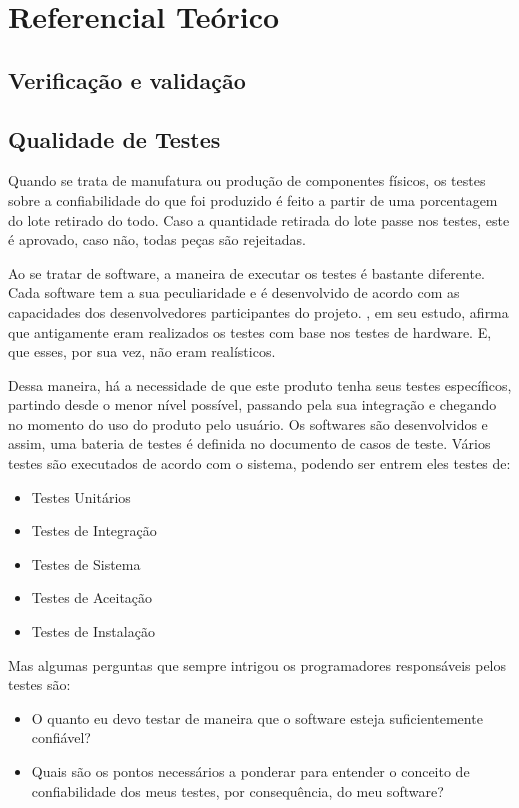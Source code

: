 \chapter[Referencial]{Referencial Teórico}

\section{Verificação e validação}
\section{Qualidade de Testes}
Quando se trata de manufatura ou produção de componentes físicos, os testes
sobre a confiabilidade do que foi produzido é feito a partir de uma porcentagem
do lote retirado do todo. Caso a quantidade retirada do lote passe nos testes,
este é aprovado, caso não, todas peças são rejeitadas.

Ao se tratar de software, a maneira de executar os testes é bastante diferente.
Cada software tem a sua peculiaridade e é desenvolvido de acordo com as
capacidades dos desenvolvedores participantes do projeto. \cite{e08}, em seu estudo,
afirma que antigamente eram realizados os testes com base nos testes de hardware.
E, que esses, por sua vez, não eram realísticos.

Dessa maneira, há a necessidade de que este produto tenha seus testes específicos,
partindo desde o menor nível possível, passando pela sua integração e chegando
no momento do uso do produto pelo usuário.
Os softwares são desenvolvidos e assim, uma bateria de testes é definida no
documento de casos de teste. Vários testes são  executados de acordo com o sistema,
podendo ser entrem eles testes de:

\begin{itemize}
\item Testes Unitários
\item Testes de Integração
\item Testes de Sistema
\item Testes de Aceitação
\item Testes de Instalação
\end{itemize}

Mas algumas perguntas que sempre intrigou os programadores responsáveis pelos testes são:

\begin{itemize}
\item O quanto eu devo testar de maneira que o software esteja suficientemente
confiável?
\item Quais são os pontos necessários a ponderar para entender o conceito
de confiabilidade dos meus testes, por consequência, do meu software?
\end{itemize}

